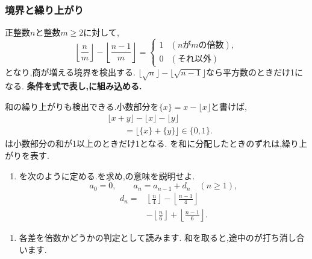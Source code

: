 \subsubsection{境界と繰り上がり}\label{節：境界と繰り上がり}
正整数$n$と整数$m\ge2$に対して,
\[
  \left\lfloor\frac nm\right\rfloor-
  \left\lfloor\frac{n-1}{m}\right\rfloor
  =\begin{cases}
    1 & (n\text{が}m\text{の倍数}),\\
    0 & (\text{それ以外})
  \end{cases}
\]
となり,商が増える境界を検出する.
$\lfloor\sqrt n\rfloor-\lfloor\sqrt{n-1}\rfloor$なら平方数のときだけ1になる.
\textbf{条件を式で表し,に組み込める.}

和の繰り上がりも検出できる.小数部分を$\{x\}=x-\lfloor x\rfloor$と書けば,
\begin{align*}
  &\lfloor x+y\rfloor-\lfloor x\rfloor-\lfloor y\rfloor\\
  &\qquad=\lfloor\{x\}+\{y\}\rfloor\in\{0,1\}.
\end{align*}
は小数部分の和が1以上のときだけ1となる.
を和に分配したときのずれは,繰り上がりを表す.

\noindent {}\par\nobreak
\begin{enumerate}[label=(\arabic*),parsep=3pt,beginpenalty=10000,format=\bookitemlink{example-gauss-role-4}{problem}{answer}]
  \item {}を次のように定める.を求め,の意味を説明せよ.
    \[
      a_0=0,\qquad a_n=a_{n-1}+d_n\quad(n\ge1),
    \]
    \[
      \begin{aligned}
        d_n={}&\left\lfloor\frac n4\right\rfloor
        -\left\lfloor\frac{n-1}{4}\right\rfloor\\
        &-\left\lfloor\frac n6\right\rfloor
        +\left\lfloor\frac{n-1}{6}\right\rfloor.
      \end{aligned}
    \]
\end{enumerate}

\noindent {}\par\nobreak
\begin{enumerate}[label=(\arabic*),parsep=3pt,beginpenalty=10000,format=\bookitemlink{example-gauss-role-4}{hint}{problem}]
  \item 各差を倍数かどうかの判定として読みます.
    和を取ると,途中のが打ち消し合います.
\end{enumerate}

